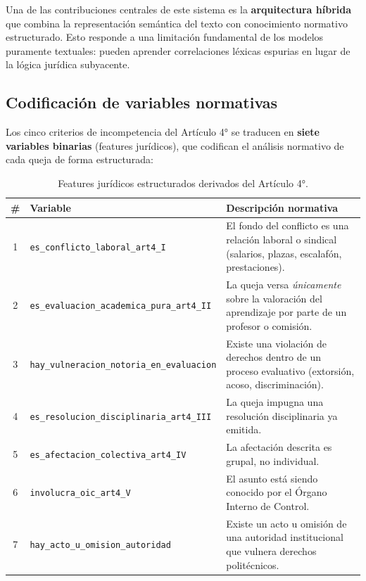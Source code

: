 Una de las contribuciones centrales de este sistema es la \textbf{arquitectura
híbrida} que combina la representación semántica del texto con conocimiento
normativo estructurado. Esto responde a una limitación fundamental de los
modelos puramente textuales: pueden aprender correlaciones léxicas espurias
en lugar de la lógica jurídica subyacente.

\subsection{Codificación de variables normativas}

Los cinco criterios de incompetencia del Artículo 4° se traducen en
\textbf{siete variables binarias} (features jurídicos), que codifican el
análisis normativo de cada queja de forma estructurada:

\begin{table}[H]
\centering
\caption{Features jurídicos estructurados derivados del Artículo 4°.}
\label{tab:features_mt}
\begin{tabularx}{\textwidth}{clX}
\toprule
\textbf{\#} & \textbf{Variable} & \textbf{Descripción normativa} \\
\midrule
1 & \texttt{es\_conflicto\_laboral\_art4\_I} &
    El fondo del conflicto es una relación laboral o sindical
    (salarios, plazas, escalafón, prestaciones). \\
2 & \texttt{es\_evaluacion\_academica\_pura\_art4\_II} &
    La queja versa \emph{únicamente} sobre la valoración del
    aprendizaje por parte de un profesor o comisión. \\
3 & \texttt{hay\_vulneracion\_notoria\_en\_evaluacion} &
    Existe una violación de derechos dentro de un proceso
    evaluativo (extorsión, acoso, discriminación). \\
4 & \texttt{es\_resolucion\_disciplinaria\_art4\_III} &
    La queja impugna una resolución disciplinaria ya emitida. \\
5 & \texttt{es\_afectacion\_colectiva\_art4\_IV} &
    La afectación descrita es grupal, no individual. \\
6 & \texttt{involucra\_oic\_art4\_V} &
    El asunto está siendo conocido por el Órgano Interno de
    Control. \\
7 & \texttt{hay\_acto\_u\_omision\_autoridad} &
    Existe un acto u omisión de una autoridad institucional
    que vulnera derechos politécnicos. \\
\bottomrule
\end{tabularx}
\end{table}

